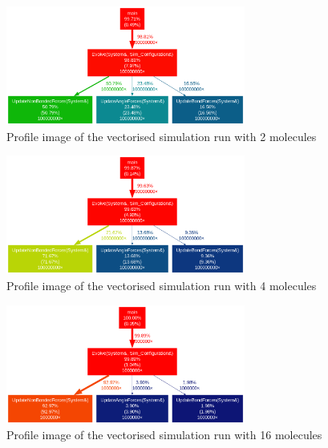 \documentclass{article}
\begin{document}
\begin{figure}
    \includegraphics[width=0.7\textwidth]{Images/vec_2mol_profile.png
    }
    \centering
    \caption{Profile image of the vectorised simulation run with 2 molecules}
    \label{fig: vec profile 2 molecule}
\end{figure}

\begin{figure}
    \includegraphics[width=0.7\textwidth]{Images/vec_4mol_profile.png}
    \centering
    \caption{Profile image of the vectorised simulation run with 4 molecules}
    \label{fig: vec profile 4 molecule}
\end{figure}
\begin{figure}
    \includegraphics[width=0.7\textwidth]{Images/vec_16mol_profile.png
    }
    \centering
    \caption{Profile image of the vectorised simulation run with 16 molecules}
    \label{fig: vec profile 16 molecule}
\end{figure}
\end{document}
